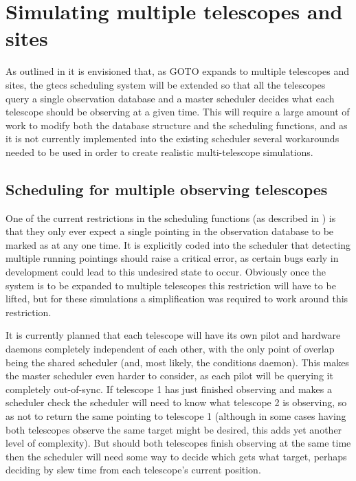 
\newpage
\section{Simulating multiple telescopes and sites}
\label{sec:multi_site}
\begin{colsection}


\begin{colsection}

As outlined in  it is envisioned that, as GOTO expands to multiple telescopes and sites, the \gls{gtecs} scheduling system will be extended so that all the telescopes query a single observation database and a master scheduler decides what each telescope should be observing at a given time. This will require a large amount of work to modify both the database structure and the scheduling functions, and as it is not currently implemented into the existing scheduler several workarounds needed to be used in order to create realistic multi-telescope simulations.

\end{colsection}


\subsection{Scheduling for multiple observing telescopes}
\label{sec:multi_tel_scheduling}
\begin{colsection}

One of the current restrictions in the scheduling functions (as described in ) is that they only ever expect a single pointing in the observation database to be marked as  at any one time. It is explicitly coded into the scheduler that detecting multiple running pointings should raise a critical error, as certain bugs early in development could lead to this undesired state to occur. Obviously once the system is to be expanded to multiple telescopes this restriction will have to be lifted, but for these simulations a simplification was required to work around this restriction.

It is currently planned that each telescope will have its own pilot and hardware daemons completely independent of each other, with the only point of overlap being the shared scheduler (and, most likely, the conditions daemon). This makes the master scheduler even harder to consider, as each pilot will be querying it completely out-of-sync. If telescope 1 has just finished observing and makes a scheduler check the scheduler will need to know what telescope 2 is observing, so as not to return the same pointing to telescope 1 (although in some cases having both telescopes observe the same target might be desired, this adds yet another level of complexity). But should both telescopes finish observing at the same time then the scheduler will need some way to decide which gets what target, perhaps deciding by slew time from each telescope's current position.


\end{colsection}
\end{colsection}
